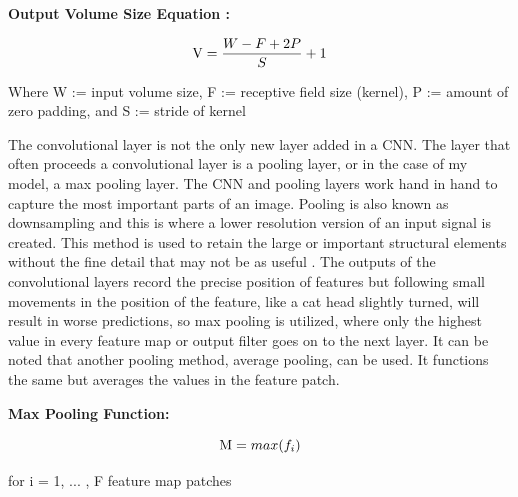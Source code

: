 \documentclass[12pt]{article}
\begin{document}
                \textbf{Output Volume Size Equation \cite{cs231n2023}:}
                
                \begin{large}
                    
                    \[ \textnormal{V} = \frac{W - F + 2P}{S} + 1    \]

                \end{large}

                Where W := input volume size, F := receptive field size (kernel), P := amount of zero padding, and S := stride of kernel

                The convolutional layer is not the only new layer added in a CNN. 
                The layer that often proceeds a convolutional layer is a pooling layer, or in the case of my model, a max pooling layer.
                The CNN and pooling layers work hand in hand to capture the most important parts of an image. 
                Pooling is also known as downsampling and this is where a lower resolution version of an input signal is created. 
                This method is used to retain the large or important structural elements 
                without the fine detail that may not be as useful \cite{brownlee2020}. 
                The outputs of the convolutional layers record the precise position of features 
                but following small movements in the position of the feature, like a cat head slightly turned, 
                will result in worse predictions, so max pooling is utilized, 
                where only the highest value in every feature map or output filter goes on to the next layer. 
                It can be noted that another pooling method, average pooling, can be used. 
                It functions the same but averages the values in the feature patch.

                \textbf{Max Pooling Function:}
            
                \begin{large}
                    
                    \[ \textnormal{M} = max(f_i)  \]

                \end{large}

                for i = 1, ... , F feature map patches
\end{document}
